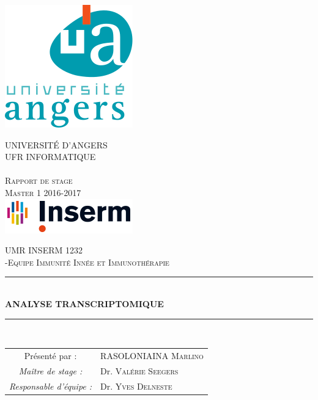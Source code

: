 \documentclass[a4paper,10pt]{article}
\newcommand\tabA[1][0.5cm]{\hspace*{#1}}
\newcommand\tabC[1][2cm]{\hspace*{#1}}
\newcommand{\HRule}{\rule{\linewidth}{0.5mm}}
\begin{document}
\begin{titlepage}
  \begin{sffamily}
  \begin{center}

 \begin{center}
 \includegraphics[scale=0.5]{./image/ualogo.png}
\end{center}

    \textsc{ UNIVERSIT\'{E} D'ANGERS \\ UFR INFORMATIQUE}\\[0.5cm]
    \textsc{ \\ Rapport de stage \\ Master 1 2016-2017 }\\[1.5cm]
    
    \includegraphics{./image/logo-generique-SD.png}
    
    \textsc{UMR INSERM 1232 \\-Equipe Immunité Innée et Immunothérapie}\\[1cm]
     
    \HRule \\[0.4cm]
    { \huge \bfseries ANALYSE TRANSCRIPTOMIQUE\\[0.4cm] }

    \HRule \\[2cm]
    \centering\vspace*{\fill}
    \begin{minipage}{9\textwidth}
    \begin{doublespace}
    \begin{tabular}{cl}
       \large Présenté par : &\tabC \tabA \textsc{RASOLONIAINA Marlino}\\
       \newline
       \emph{Maître de stage  :} &\tabC \tabA Dr. \textsc{Valérie Seegers}\\
       \emph{Responsable d'équipe : } &\tabC \tabA Dr.  \textsc{Yves Delneste} \\
       

\end{tabular}
\end{doublespace}
\end{minipage}
\end{center}
\end{sffamily}
\end{titlepage}
\end{document}
